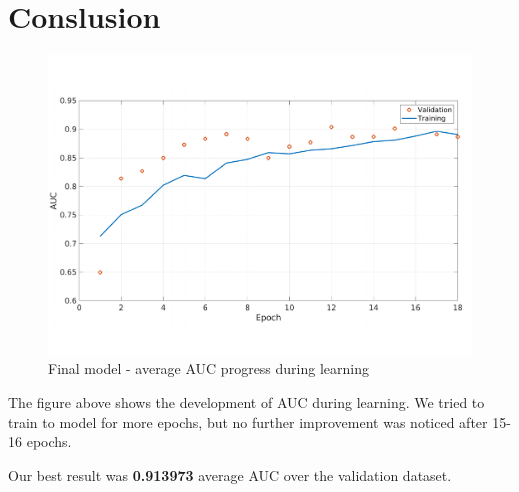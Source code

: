 \documentclass{article}
\begin{document}
\section*{Conslusion}
\begin{figure}[H]
\centering
\includegraphics[width=\textwidth]{figures/progress_AUC_091.pdf}
\caption{Final model - average AUC progress during learning}
\end{figure}
The figure above shows the development of AUC during learning. We tried to train to model for more epochs, but no further improvement was noticed after 15-16 epochs.

Our best result was \textbf{0.913973} average AUC over the validation dataset.
\end{document}
